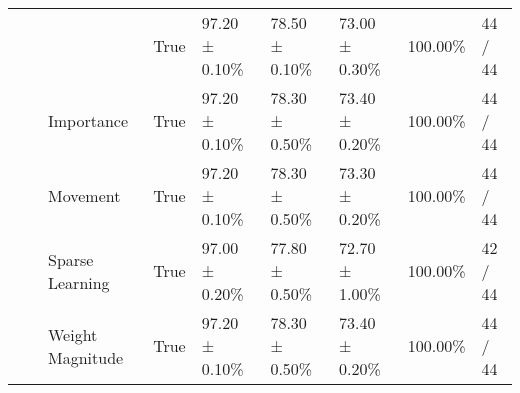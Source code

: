 \begin{tabular}{lllllllll}
 &  &  & True & 97.20 ± 0.10\% & 78.50 ± 0.10\% & 73.00 ± 0.30\% & 100.00\% & 44 / 44 \\
\cline{3-9}
 &  & Importance & True & 97.20 ± 0.10\% & 78.30 ± 0.50\% & 73.40 ± 0.20\% & 100.00\% & 44 / 44 \\
\cline{3-9}
 &  & Movement & True & 97.20 ± 0.10\% & 78.30 ± 0.50\% & 73.30 ± 0.20\% & 100.00\% & 44 / 44 \\
\cline{3-9}
 &  & Sparse Learning & True & 97.00 ± 0.20\% & 77.80 ± 0.50\% & 72.70 ± 1.00\% & 100.00\% & 42 / 44 \\
\cline{3-9}
 &  & Weight Magnitude & True & 97.20 ± 0.10\% & 78.30 ± 0.50\% & 73.40 ± 0.20\% & 100.00\% & 44 / 44 \\
\cline{1-9} \cline{2-9} \cline{3-9}
\bottomrule
\end{tabular}
